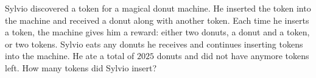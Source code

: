 Sylvio discovered a token for a magical donut machine. He inserted the token into the machine and received a donut along with another token. Each time he inserts a token, the machine gives him a reward: either two donuts, a donut and a token, or two tokens. Sylvio eats any donuts he receives and continues inserting tokens into the machine. He ate a total of $2025$ donuts and did not have anymore tokens left. How many tokens did Sylvio insert?
